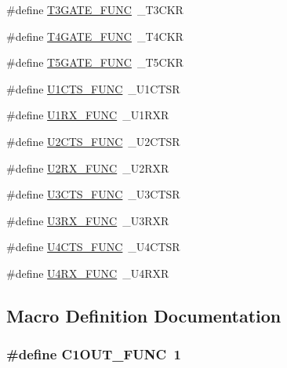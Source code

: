 \begin{DoxyCompactItemize}
\item 
\#define \hyperlink{pps-macro_8h_ac6006c72b254e0e1c31c4c9bf5fd92d4}{T3\+G\+A\+T\+E\+\_\+\+F\+U\+N\+C}~\+\_\+\+T3\+C\+K\+R
\item 
\#define \hyperlink{pps-macro_8h_a0ac018197af0d92fb338044b0827e374}{T4\+G\+A\+T\+E\+\_\+\+F\+U\+N\+C}~\+\_\+\+T4\+C\+K\+R
\item 
\#define \hyperlink{pps-macro_8h_add7e882ae00488976899cb7c42273703}{T5\+G\+A\+T\+E\+\_\+\+F\+U\+N\+C}~\+\_\+\+T5\+C\+K\+R
\item 
\#define \hyperlink{pps-macro_8h_a93a74a3884ded23da27ffdd14a8a62ba}{U1\+C\+T\+S\+\_\+\+F\+U\+N\+C}~\+\_\+\+U1\+C\+T\+S\+R
\item 
\#define \hyperlink{pps-macro_8h_a0620a5e96079a9e856ae146d7f1f2f11}{U1\+R\+X\+\_\+\+F\+U\+N\+C}~\+\_\+\+U1\+R\+X\+R
\item 
\#define \hyperlink{pps-macro_8h_a38b345c7311932386c170318a99503f9}{U2\+C\+T\+S\+\_\+\+F\+U\+N\+C}~\+\_\+\+U2\+C\+T\+S\+R
\item 
\#define \hyperlink{pps-macro_8h_adcda8db9522945bb7767efa2d742e797}{U2\+R\+X\+\_\+\+F\+U\+N\+C}~\+\_\+\+U2\+R\+X\+R
\item 
\#define \hyperlink{pps-macro_8h_aa84e43b73aa992cf05e8a434cc0c0a59}{U3\+C\+T\+S\+\_\+\+F\+U\+N\+C}~\+\_\+\+U3\+C\+T\+S\+R
\item 
\#define \hyperlink{pps-macro_8h_a17220cf7664f4d1ae834d718923b3c38}{U3\+R\+X\+\_\+\+F\+U\+N\+C}~\+\_\+\+U3\+R\+X\+R
\item 
\#define \hyperlink{pps-macro_8h_a74b59e75890d3dfb7a78e1085ab823af}{U4\+C\+T\+S\+\_\+\+F\+U\+N\+C}~\+\_\+\+U4\+C\+T\+S\+R
\item 
\#define \hyperlink{pps-macro_8h_aee668f9d0b6876d22b1322aa049a0856}{U4\+R\+X\+\_\+\+F\+U\+N\+C}~\+\_\+\+U4\+R\+X\+R
\end{DoxyCompactItemize}


\subsection{Macro Definition Documentation}
\hypertarget{pps-macro_8h_afee8c7a5f7dbdfcd814fb517eed618ee}{}
\subsubsection[{C1\+O\+U\+T\+\_\+\+F\+U\+N\+C}]{\setlength{\rightskip}{0pt plus 5cm}\#define C1\+O\+U\+T\+\_\+\+F\+U\+N\+C~1}\label{pps-macro_8h_afee8c7a5f7dbdfcd814fb517eed618ee}



